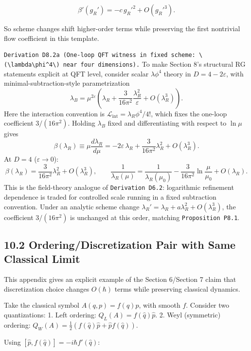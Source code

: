 \documentclass[
]{article}
\begin{document}
\[
\beta'(g_R')=-c\,{g_R'}^2+O({g_R'}^3).
\]

So scheme changes shift higher-order terms while preserving the first
nontrivial flow coefficient in this template.

\texttt{Derivation\ D8.2a\ (One-loop\ QFT\ witness\ in\ fixed\ scheme:\ \textbackslash{}(\textbackslash{}lambda\textbackslash{}phi\^{}4\textbackslash{})\ near\ four\ dimensions).}
To make Section 8's structural RG statements explicit at QFT level,
consider scalar \(\lambda\phi^4\) theory in \(D=4-2\varepsilon\), with
minimal-subtraction-style parametrization \[
\lambda_B
=
\mu^{2\varepsilon}\!\left(
\lambda_R
+\frac{3}{16\pi^2}\frac{\lambda_R^2}{\varepsilon}
+O(\lambda_R^3)
\right).
\] Here the interaction convention is
\(\mathcal L_{\mathrm{int}}=\lambda_R\phi^4/4!\), which fixes the
one-loop coefficient \(3/(16\pi^2)\). Holding \(\lambda_B\) fixed and
differentiating with respect to \(\ln\mu\) gives \[
\beta(\lambda_R)\equiv \mu\frac{d\lambda_R}{d\mu}
=
-2\varepsilon\,\lambda_R
+\frac{3}{16\pi^2}\lambda_R^2
+O(\lambda_R^3).
\] At \(D=4\) (\(\varepsilon\to0\)): \[
\beta(\lambda_R)=\frac{3}{16\pi^2}\lambda_R^2+O(\lambda_R^3),
\qquad
\frac{1}{\lambda_R(\mu)}
=
\frac{1}{\lambda_R(\mu_0)}
-\frac{3}{16\pi^2}\ln\!\frac{\mu}{\mu_0}
+O(\lambda_R).
\] This is the field-theory analogue of \texttt{Derivation\ D6.2}:
logarithmic refinement dependence is traded for controlled scale running
in a fixed subtraction convention. Under an analytic scheme change
\(\lambda_R'=\lambda_R+a\lambda_R^2+O(\lambda_R^3)\), the coefficient
\(3/(16\pi^2)\) is unchanged at this order, matching
\texttt{Proposition\ P8.1}.

\subsection{10.2 Ordering/Discretization Pair with Same Classical
Limit}\label{orderingdiscretization-pair-with-same-classical-limit}

This appendix gives an explicit example of the Section 6/Section 7 claim
that discretization choice changes \(O(\hbar)\) terms while preserving
classical dynamics.

Take the classical symbol \(A(q,p)=f(q)p\), with smooth \(f\). Consider
two quantizations: 1. Left ordering: \(Q_L(A)=f(\hat q)\hat p\). 2. Weyl
(symmetric) ordering:
\(Q_W(A)=\frac12\left(f(\hat q)\hat p+\hat p f(\hat q)\right)\).

Using \([\hat p,f(\hat q)]=-i\hbar f'(\hat q)\):
\end{document}
